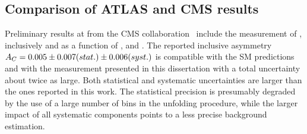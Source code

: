 \subsection{Comparison of ATLAS and CMS results}

Preliminary results at \eighttev{} from the CMS
collaboration~\cite{CMS-PAS-TOP-12-033} include the measurement of
\ac{}, inclusively and as a function of \mtt{}, \pttt{} and \ytt{}.
The reported inclusive asymmetry
$A_C{}=0.005\pm0.007(stat.)\pm0.006(syst.)$ is compatible with the SM
predictions and with the measurement presented in this dissertation
with a total uncertainty about twice as large. Both
statistical and systematic uncertainties are larger than the ones
reported in this work. The statistical precision is presumably
degraded by the use of a large number of \dy{} bins in the unfolding
procedure, while the larger impact of all systematic components
points to a less precise background estimation.


